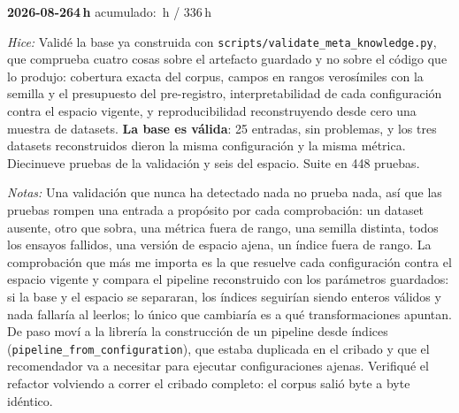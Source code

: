 \documentclass[11pt,letterpaper]{article}
\newcommand{\presupuesto}{336}
\newcommand{\horasacum}{0}
\newcommand{\entrada}[4]{%
  \xdef\horasacum{\fpeval{\horasacum + #2}}%
  \par\medskip
  \noindent\textbf{\color{tecnavy}#1}\quad\textbf{#2\,h}%
  \hfill{\small\color{gris}acumulado: \horasacum\,h / \presupuesto\,h}\par
  \nopagebreak
  \noindent\textit{Hice:} #3\par
  \nopagebreak
  \noindent\textit{Notas:} #4\par
}
\begin{document}
\entrada{2026-08-26}{4}
{Validé la base ya construida con \texttt{scripts/validate\_meta\_knowledge.py}, que
 comprueba cuatro cosas sobre el artefacto guardado y no sobre el código que lo produjo:
 cobertura exacta del corpus, campos en rangos verosímiles con la semilla y el presupuesto
 del pre-registro, interpretabilidad de cada configuración contra el espacio vigente, y
 reproducibilidad reconstruyendo desde cero una muestra de datasets. \textbf{La base es
 válida}: 25 entradas, sin problemas, y los tres datasets reconstruidos dieron la misma
 configuración y la misma métrica. Diecinueve pruebas de la validación y seis del espacio.
 Suite en 448 pruebas.}
{Una validación que nunca ha detectado nada no prueba nada, así que las pruebas rompen una
 entrada a propósito por cada comprobación: un dataset ausente, otro que sobra, una métrica
 fuera de rango, una semilla distinta, todos los ensayos fallidos, una versión de espacio
 ajena, un índice fuera de rango. La comprobación que más me importa es la que resuelve cada
 configuración contra el espacio vigente y compara el pipeline reconstruido con los
 parámetros guardados: si la base y el espacio se separaran, los índices seguirían siendo
 enteros válidos y nada fallaría al leerlos; lo único que cambiaría es a qué
 transformaciones apuntan. De paso moví a la librería la construcción de un pipeline desde
 índices (\texttt{pipeline\_from\_configuration}), que estaba duplicada en el cribado y que
 el recomendador va a necesitar para ejecutar configuraciones ajenas. Verifiqué el refactor
 volviendo a correr el cribado completo: el corpus salió byte a byte idéntico.}
\end{document}
